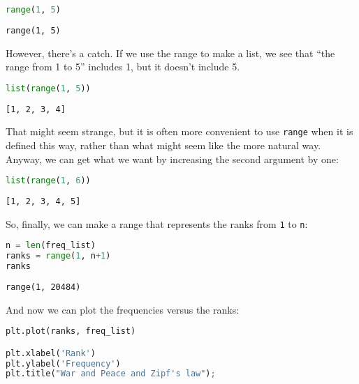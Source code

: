 \begin{lstlisting}[language=Python,style=source]
range(1, 5)
\end{lstlisting}

\begin{lstlisting}[style=output]
range(1, 5)
\end{lstlisting}

However, there's a catch. If we use the range to make a list, we see
that ``the range from 1 to 5'' includes 1, but it doesn't include 5.

\begin{lstlisting}[language=Python,style=source]
list(range(1, 5))
\end{lstlisting}

\begin{lstlisting}[style=output]
[1, 2, 3, 4]
\end{lstlisting}

That might seem strange, but it is often more convenient to use
\passthrough{\lstinline!range!} when it is defined this way, rather than
what might seem like the more natural way. Anyway, we can get what we
want by increasing the second argument by one:

\begin{lstlisting}[language=Python,style=source]
list(range(1, 6))
\end{lstlisting}

\begin{lstlisting}[style=output]
[1, 2, 3, 4, 5]
\end{lstlisting}

So, finally, we can make a range that represents the ranks from
\passthrough{\lstinline!1!} to \passthrough{\lstinline!n!}:

\begin{lstlisting}[language=Python,style=source]
n = len(freq_list)
ranks = range(1, n+1)
ranks
\end{lstlisting}

\begin{lstlisting}[style=output]
range(1, 20484)
\end{lstlisting}

And now we can plot the frequencies versus the ranks:

\begin{lstlisting}[language=Python,style=source]
plt.plot(ranks, freq_list)

plt.xlabel('Rank')
plt.ylabel('Frequency')
plt.title("War and Peace and Zipf's law");
\end{lstlisting}

